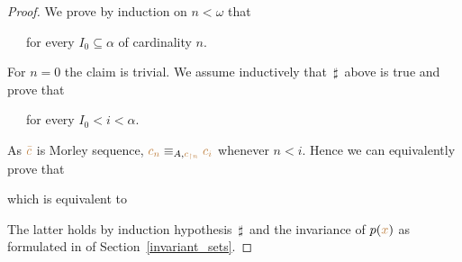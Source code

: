 \documentclass[creche.tex]{subfiles}
\begin{document}
\begin{proof}


We prove by induction on $n<\omega$ that

\ \ \ for every $I_0\subseteq\alpha$ of cardinality $n$.

For $n=0$ the claim is trivial. We assume inductively that $\,\sharp\,$ above is true and prove that

\ \ \ for every $I_0<i<\alpha$.

As ${\color{brown}\bar c}$ is  Morley sequence, ${\color{brown} c_n}\equiv_{A,{\color{brown} c_{\restriction n}}} {\color{brown} c_i}$ whenever $n<i$.
Hence we can equivalently prove that


which is equivalent to


The latter holds by induction hypothesis $\,\sharp\,$ and the invariance of $p({\color{brown} x})$ as formulated in  of Section~\ref{invariant_sets}.
\end{proof}




\end{document}
